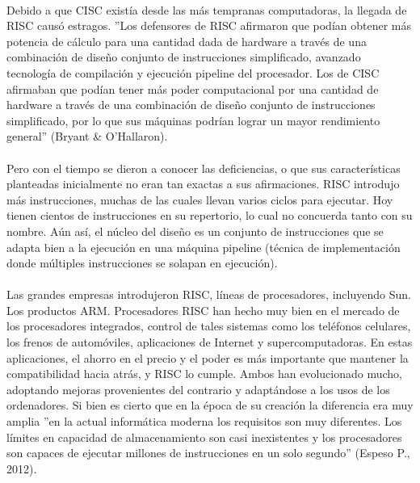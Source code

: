 \documentclass[10pt,a4paper]{article}
\begin{document}
\paragraph{}
Debido a que CISC existía desde las más tempranas computadoras, la llegada de RISC causó estragos. ''Los defensores de RISC afirmaron que podían obtener más potencia de cálculo para una cantidad dada de hardware a través de una combinación de diseño conjunto de instrucciones simplificado, avanzado tecnología de compilación y ejecución pipeline del procesador. Los de CISC afirmaban que podían tener más poder computacional por una cantidad de hardware a través de una combinación de diseño conjunto de instrucciones simplificado, por lo que sus máquinas podrían lograr un mayor rendimiento general'' (Bryant \& O'Hallaron).

\paragraph{}
Pero con el tiempo se dieron a conocer las deficiencias, o que sus características planteadas inicialmente no eran tan exactas a sus afirmaciones. RISC introdujo más instrucciones, muchas de las cuales llevan varios ciclos para ejecutar. Hoy tienen cientos de instrucciones en su repertorio, lo cual no concuerda tanto con su nombre. Aún así, el núcleo del diseño es un conjunto de instrucciones que se adapta bien a la ejecución en una máquina pipeline (técnica de implementación donde múltiples instrucciones se solapan en ejecución).
	 	 	 	
\paragraph{}
Las grandes empresas introdujeron RISC, líneas de procesadores, incluyendo Sun. Los productos ARM. Procesadores RISC han hecho muy bien en el mercado de los procesadores integrados, control de tales sistemas como los teléfonos celulares, los frenos de automóviles, aplicaciones de Internet y supercomputadoras. En estas aplicaciones, el ahorro en el precio y el poder es más importante que mantener la compatibilidad hacia atrás, y RISC lo cumple. Ambos han evolucionado mucho, adoptando mejoras provenientes del contrario y adaptándose a los usos de los ordenadores. Si bien es cierto que en la época de su creación la diferencia era muy amplia ''en la actual informática moderna los requisitos son muy diferentes. Los límites en capacidad de almacenamiento son casi inexistentes y los procesadores son capaces de ejecutar millones de instrucciones en un solo segundo'' (Espeso P., 2012).
\end{document}
